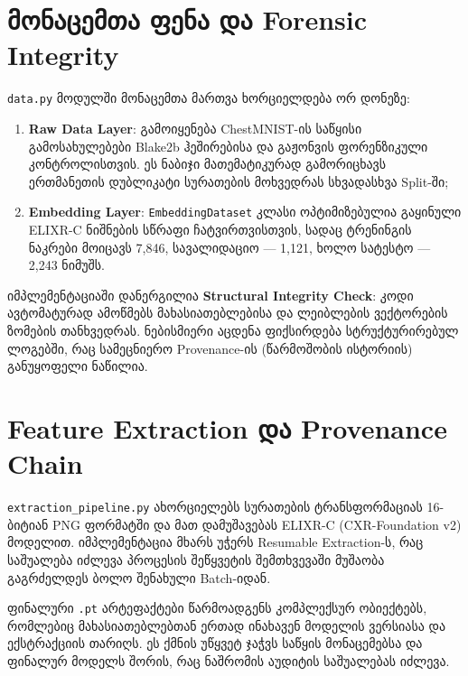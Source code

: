 \documentclass[12pt,a4paper,oneside]{report}
\begin{document}
\section{მონაცემთა ფენა და Forensic Integrity}
\texttt{data.py} მოდულში მონაცემთა მართვა ხორციელდება ორ დონეზე:
\begin{enumerate}[leftmargin=1.6em]
    \item \textbf{Raw Data Layer}: გამოიყენება ChestMNIST-ის საწყისი გამოსახულებები Blake2b ჰეშირებისა და გაჟონვის ფორენზიკული კონტროლისთვის. ეს ნაბიჯი მათემატიკურად გამორიცხავს ერთმანეთის დუბლიკატი სურათების მოხვედრას სხვადასხვა Split-ში;
    \item \textbf{Embedding Layer}: \texttt{EmbeddingDataset} კლასი ოპტიმიზებულია გაყინული ELIXR-C ნიშნების სწრაფი ჩატვირთვისთვის, სადაც ტრენინგის ნაკრები მოიცავს 7,846, სავალიდაციო — 1,121, ხოლო სატესტო — 2,243 ნიმუშს.
\end{enumerate}

იმპლემენტაციაში დანერგილია \textbf{Structural Integrity Check}: კოდი ავტომატურად ამოწმებს მახასიათებლებისა და ლეიბლების ვექტორების ზომების თანხვედრას. ნებისმიერი აცდენა ფიქსირდება სტრუქტურირებულ ლოგებში, რაც სამეცნიერო Provenance-ის (წარმოშობის ისტორიის) განუყოფელი ნაწილია.

\section{Feature Extraction და Provenance Chain}
\texttt{extraction\_pipeline.py} ახორციელებს სურათების ტრანსფორმაციას 16-ბიტიან PNG ფორმატში და მათ დამუშავებას ELIXR-C (CXR-Foundation v2) მოდელით. იმპლემენტაცია მხარს უჭერს Resumable Extraction-ს, რაც საშუალება იძლევა პროცესის შეწყვეტის შემთხვევაში მუშაობა გაგრძელდეს ბოლო შენახული Batch-იდან.

ფინალური \texttt{.pt} არტეფაქტები წარმოადგენს კომპლექსურ ობიექტებს, რომლებიც მახასიათებლებთან ერთად ინახავენ მოდელის ვერსიასა და ექსტრაქციის თარიღს. ეს ქმნის უწყვეტ ჯაჭვს საწყის მონაცემებსა და ფინალურ მოდელს შორის, რაც ნაშრომის აუდიტის საშუალებას იძლევა.
\end{document}
